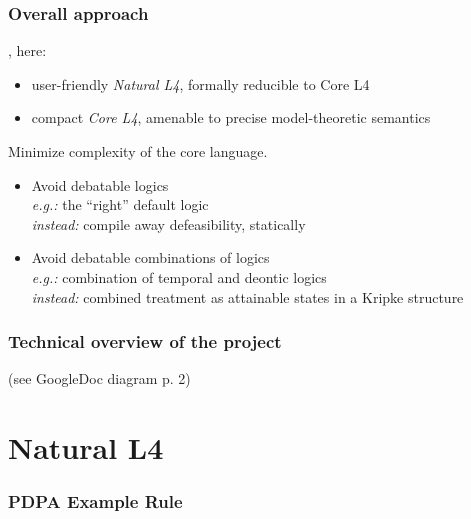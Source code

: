 \documentclass{beamer}
\begin{document}
\begin{frame}[fragile]\frametitle{Overall approach}

  , here:
  \begin{itemize}
  \item user-friendly \emph{Natural L4}, formally reducible to Core L4
  \item compact \emph{Core L4}, amenable to precise model-theoretic semantics
  \end{itemize}

   Minimize complexity of the core language.
  \begin{itemize}
  \item Avoid debatable logics\\
    \emph{e.g.:} the ``right'' default logic\\
    \emph{instead:} compile away defeasibility, statically
  \item Avoid debatable combinations of logics\\
    \emph{e.g.:} combination of temporal and deontic logics\\
    \emph{instead:} combined treatment as attainable states in a Kripke structure
  \end{itemize}
  
\end{frame}


\begin{frame}[fragile]\frametitle{Technical overview of the project}


   (see GoogleDoc diagram p. 2)

\end{frame}



\section{Natural L4}


\begin{frame}[fragile]\frametitle{PDPA Example Rule}



\end{frame}
\end{document}
